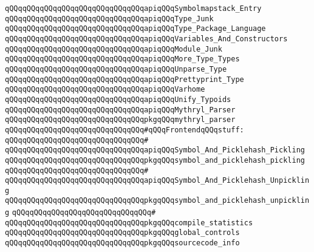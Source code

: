 \verb|qQQqqQQqqQQqqQQqqQQqqQQqqQQqqQQqapiqQQqSymbolmapstack_Entry|\newline
\verb|qQQqqQQqqQQqqQQqqQQqqQQqqQQqqQQqapiqQQqType_Junk|\newline
\verb|qQQqqQQqqQQqqQQqqQQqqQQqqQQqqQQqapiqQQqType_Package_Language|\newline
\verb|qQQqqQQqqQQqqQQqqQQqqQQqqQQqqQQqapiqQQqVariables_And_Constructors|\newline
\verb|qQQqqQQqqQQqqQQqqQQqqQQqqQQqqQQqapiqQQqModule_Junk|\newline
\verb|qQQqqQQqqQQqqQQqqQQqqQQqqQQqqQQqapiqQQqMore_Type_Types|\newline
\verb|qQQqqQQqqQQqqQQqqQQqqQQqqQQqqQQqapiqQQqUnparse_Type|\newline
\verb|qQQqqQQqqQQqqQQqqQQqqQQqqQQqqQQqapiqQQqPrettyprint_Type|\newline
\verb|qQQqqQQqqQQqqQQqqQQqqQQqqQQqqQQqapiqQQqVarhome|\newline
\verb|qQQqqQQqqQQqqQQqqQQqqQQqqQQqqQQqapiqQQqUnify_Typoids|\newline
\newline
\verb|qQQqqQQqqQQqqQQqqQQqqQQqqQQqqQQqapiqQQqMythryl_Parser|\newline
\verb|qQQqqQQqqQQqqQQqqQQqqQQqqQQqqQQqpkgqQQqmythryl_parser|\newline
\newline
\verb|qQQqqQQqqQQqqQQqqQQqqQQqqQQqqQQq#qQQqFrontendqQQqstuff:|\newline
\verb|qQQqqQQqqQQqqQQqqQQqqQQqqQQqqQQq#|\newline
\verb|qQQqqQQqqQQqqQQqqQQqqQQqqQQqqQQqapiqQQqSymbol_And_Picklehash_Pickling|\newline
\verb|qQQqqQQqqQQqqQQqqQQqqQQqqQQqqQQqpkgqQQqsymbol_and_picklehash_pickling|\newline
\verb|qQQqqQQqqQQqqQQqqQQqqQQqqQQqqQQq#|\newline
\verb|qQQqqQQqqQQqqQQqqQQqqQQqqQQqqQQqapiqQQqSymbol_And_Picklehash_Unpickling|\newline
\verb|qQQqqQQqqQQqqQQqqQQqqQQqqQQqqQQqpkgqQQqsymbol_and_picklehash_unpickling|\newline
\verb|qQQqqQQqqQQqqQQqqQQqqQQqqQQqqQQq#|\newline
\verb|qQQqqQQqqQQqqQQqqQQqqQQqqQQqqQQqpkgqQQqcompile_statistics|\newline
\verb|qQQqqQQqqQQqqQQqqQQqqQQqqQQqqQQqpkgqQQqglobal_controls|\newline
\verb|qQQqqQQqqQQqqQQqqQQqqQQqqQQqqQQqpkgqQQqsourcecode_info|\newline
